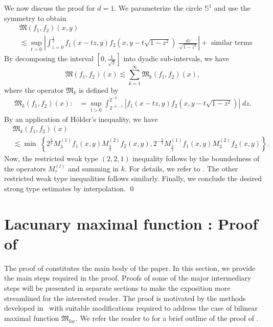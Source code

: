 \documentclass[a4paper,reqno]{amsart}
\theoremstyle{definition}
\theoremstyle{remark}
\numberwithin{equation}{section}
\newcommand{\Sp}{{\mathbb S}}
\begin{document}
	
	We now discuss the proof  for $d=1$.	We parameterize the circle $\Sp^1$ and use the symmetry to obtain
	\begin{align*}
		&\mathfrak{M}(f_1,f_2)(x,y)\\&\lesssim\sup_{t>0}\left|\int_{z=0}^{\frac{1}{2}}f_1(x-tz,y)f_2(x,y-t\sqrt{1-z^2})\;\frac{dz}{\sqrt{1-z^2}}\right|+\text{ similar terms}
	\end{align*}
	By decomposing the interval $[0,\frac{1}{\sqrt{2}}]$ into dyadic sub-intervals, we have
	\[\mathfrak{M}(f_1,f_2)(x)\lesssim\sum_{k=1}^{\infty}\mathfrak{M}_k(f_1,f_2)(x),\]
	where the operator $\mathfrak{M}_k$ is defined by
	\begin{align*}
		\mathfrak{M}_k(f_1,f_2)(x):&=\sup_{t>0}\int_{2^{-k-1}}^{2^{-k}}|f_1(x-tz,y)f_2(x,y-t\sqrt{1-z^2})|\;dz.
	\end{align*}
	By an application of H\"older's inequality, we have
	\begin{align}\label{T_k}
		&\mathfrak{M}_k(f_1,f_2)(x)\nonumber\\&\lesssim\min\;\left\{2^{\frac{k}{3}}M_3^{(1)}f_1(x,y)M_{\frac{3}{2}}^{(2)}f_2(x,y),2^{-\frac{k}{3}}M_\frac{3}{2}^{(1)}f_1(x,y)M_3^{(2)}f_2(x,y)\right\}.
	\end{align}
	Now, the restricted weak type $(2,2,1)$ inequality follows by the boundedness of the operators $M_r^{(l)}$ and summing in $k$. For details, we refer to \cite{BCSS1}. The other restricted weak type inequalities follows similarly. Finally, we conclude the desired strong type estimates by interpolation.
	\qed
	\section{Lacunary maximal function : Proof of } \label{sec:prooflacunary} The proof of  constitutes the main body of 
	the paper. In this section, we provide the main steps required in the proof. Proofs of some of the major 
	intermediary steps will be presented in separate sections to make the exposition more streamlined for the interested reader. 
	The proof is motivated by the methods developed in~\cite{ChristZhou,CG, CDR, BCSS1} with suitable modifications 
	required to address the case of bilinear maximal function $\mathfrak{M}_{lac}$. We refer the reader to  for a brief outline of the proof of . 
	
\end{document}
